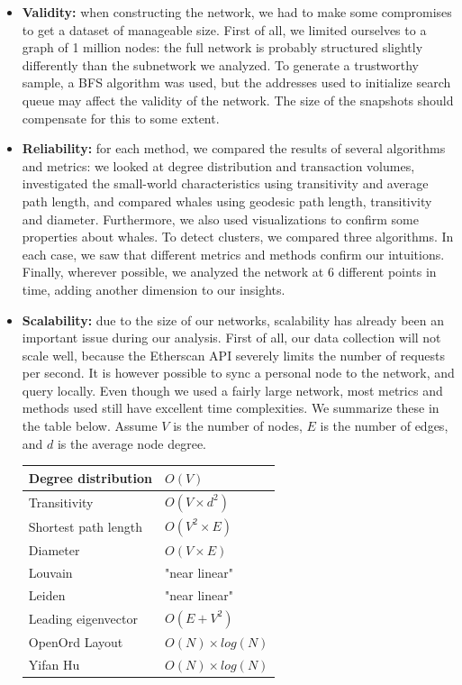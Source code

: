 \documentclass[10pt,a4paper]{article}
\begin{document}
\begin{multicols}{2}
\begin{itemize}
\item{\textbf{Validity:} when constructing the network, we had to make some compromises to get a dataset of manageable size. First of all, we limited ourselves to a graph of 1 million nodes: the full network is probably structured slightly differently than the subnetwork we analyzed. To generate a trustworthy sample, a BFS algorithm was used, but the addresses used to initialize search queue may affect the validity of the network. The size of the snapshots should compensate for this to some extent.}
\item{\textbf{Reliability:} for each method, we compared the results of several algorithms and metrics: we looked at degree distribution and transaction volumes, investigated the small-world characteristics using transitivity and average path length, and compared whales using geodesic path length, transitivity and diameter. Furthermore, we also used visualizations to confirm some properties about whales. To detect clusters, we compared three algorithms. In each case, we saw that different metrics and methods confirm our intuitions. Finally, wherever possible, we analyzed the network at 6 different points in time, adding another dimension to our insights.}
\item{\textbf{Scalability:} due to the size of our networks, scalability has already been an important issue during our analysis. First of all, our data collection will not scale well, because the Etherscan API severely limits the number of requests per second. It is however possible to sync a personal node to the network, and query locally. Even though we used a fairly large network, most metrics and methods used still have excellent time complexities. We summarize these in the table below. Assume $V$ is the number of nodes, $E$ is the number of edges, and $d$ is the average node degree.

\vspace{5pt}
\bgroup
\def\arraystretch{1.5}
\begin{tabular}{p{}|p{}}
Degree distribution & $O(V)$ \\ \hline
Transitivity & $O(V \times d^2)$ \\ \hline
Shortest path length & $O(V^2 \times E)$ \\ \hline
Diameter & $O(V \times E)$ \\ \hline
Louvain & "near linear" \\ \hline
Leiden & "near linear" \\ \hline
Leading eigenvector & $O(E+V^2)$ \\ \hline
OpenOrd Layout & $O(N) \times log(N)$ \\ \hline
Yifan Hu & $O(N) \times log(N)$ \\


\end{tabular}}
\end{itemize}
\end{multicols}
\end{document}
